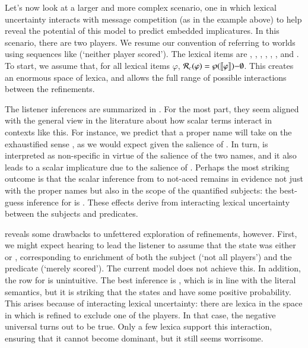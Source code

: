 \documentclass[leqno,12pt]{article}
\begin{document}
Let's now look at a larger and more complex scenario, one in which
lexical uncertainty interacts with message competition (as in the
example above) to help reveal the potential of this model to predict
embedded implicatures. In this scenario, there are two players. We
resume our convention of referring to worlds using sequences like
 (`neither player scored'). The lexical items are
, , , ,
, , and .  To start, we assume that,
for all lexical items $\varphi$,
$\mathcal{R}_{c}(\varphi) = \wp(\llbracket\varphi\rrbracket){-}\emptyset$.  This creates an
enormous space of lexica, and allows the full range of possible
interactions between the refinements.

The listener inferences are summarized in . For
the most part, they seem aligned with the general view in the
literature about how scalar terms interact in contexts like this. For
instance, we predict that a proper name  will take on the
exhaustified sense , as we would expect given the
salience of . In turn,  is interpreted as
non-specific in virtue of the salience of the two names, and it also
leads to a scalar implicature due to the salience of
. Perhaps the most striking outcome is that the scalar
inference from  to not-aced remains in evidence not just
with the proper names but also in the scope of the quantified
subjects: the best-guess inference for  is
.  These effects derive from interacting lexical uncertainty
between the subjects and predicates.

 reveals some drawbacks to unfettered exploration
of refinements, however. First, we might expect hearing  to lead the listener to assume that the state was
either  or , corresponding to enrichment of both
the subject (`not all players') and the predicate (`merely
scored'). The current model does not achieve this. In addition, the
row for  is unintuitive. The best inference is
, which is in line with the literal semantics, but it is
striking that the states  and  have some positive
probability. This arises because of interacting lexical uncertainty:
there are lexica in the space in which  is refined to
exclude one of the players. In that case, the negative universal turns
out to be true. Only a few lexica support this interaction, ensuring
that it cannot become dominant, but it still seems worrisome.
\end{document}
